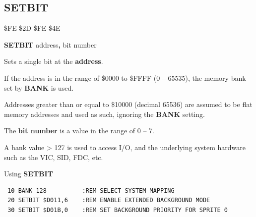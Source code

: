 \subsection{SETBIT}
\begin{description}[leftmargin=2cm,style=nextline]
\item [Token:] \$FE \$2D \$FE \$4E
\item [Format:] {\bf SETBIT} address{\bf,} bit number
\item [Usage:]  Sets a single bit at the {\bf address}.

                If the address is in the range of \$0000 to \$FFFF (0 -- 65535), the
                memory bank set by {\bf BANK} is used.

                Addresses greater than or equal to \$10000 (decimal 65536)
                are assumed to be flat memory
                addresses and used as such, ignoring the {\bf BANK} setting.

                The {\bf bit number} is a value in the range of 0 -- 7.

                 A bank value > 127 is used to access I/O,
                 and the underlying system hardware such as the
                 VIC, SID, FDC, etc.

\item [Example:] Using {\bf SETBIT}

\begin{tcolorbox}[colback=black,coltext=white]
\verbatimfont{\codefont}
\begin{verbatim}
 10 BANK 128          :REM SELECT SYSTEM MAPPING
 20 SETBIT $D011,6    :REM ENABLE EXTENDED BACKGROUND MODE
 30 SETBIT $D01B,0    :REM SET BACKGROUND PRIORITY FOR SPRITE 0
\end{verbatim}
\end{tcolorbox}
\end{description}


\newpage
